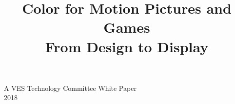 \documentclass[a4paper]{report}
\title{\Large Color for Motion Pictures and Games\\ \small From Design to Display}
\begin{document}
\maketitle

\large A VES Technology Committee White Paper\\
2018



\tableofcontents












\end{document}
